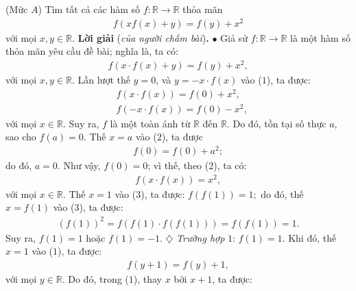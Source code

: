 \begin{multicols}{2}
	{}
	(Mức $A$) Tìm tất cả các hàm số \linebreak $f: \mathbb{R} \rightarrow \mathbb{R}$ thỏa mãn
	\begin{align*}
		f(x f(x)+y)=f(y)+x^{2}
	\end{align*}
	với mọi $x,y\in\mathbb R$.
	\vskip 0.05cm
	\textbf{\color{thachthuctoanhoc}Lời giải} (\textit{của người chấm bài})\textbf{\color{thachthuctoanhoc}.}
	\vskip 0.05cm
	$\bullet$ Giả sử $f: \mathbb{R} \to \mathbb{R}$ là một hàm số thỏa mãn yêu cầu đề bài; nghĩa là, ta có:
	\begin{align*}
		f\left( {x \cdot f\left( x \right) + y} \right) = f\left( y \right) + {x^2}, \tag{$1$}
	\end{align*}
	với mọi  $x,y \in \mathbb{R}$.
	\vskip 0.05cm
	Lần lượt thế $y = 0$, và $y = -x \cdot f(x)$  vào ($1$), ta được:
	\begin{align*}
		&f\left( {x \cdot f\left( x \right)} \right) = f\left( 0 \right) + {x^2}, \tag{$2$}\\
		&f\left( { - x \cdot f\left( x \right)} \right) = f\left( 0 \right) - {x^2},
	\end{align*}
	với mọi  $x \in \mathbb{R}$. Suy ra, $f$  là một toàn ánh từ $\mathbb{R}$  đến  $\mathbb{R}$. Do đó, tồn tại số thực $a$, sao cho $f(a )= 0$.
	\vskip 0.05cm 
	Thế $x = a$ vào ($2$), ta được
	\begin{align*}
		f\left( 0 \right) = f\left( 0 \right) + {a^2};
	\end{align*}
	do đó, $a = 0$. Như vậy,  $f(0) = 0$; vì thế, theo ($2$), ta có:
	\begin{align*}
		f\left( {x \cdot f\left( x \right)} \right) = {x^2}, \tag{$3$}
	\end{align*}
	với mọi  $x \in \mathbb{R}$.
	\vskip 0.05cm
	Thế $x = 1$ vào ($3$), ta được:  $f\left( {f\left( 1 \right)} \right) = 1;$ do đó, thế  $x = f(1)$ vào ($3$), ta được:
	\begin{align*}
		{\left( {f(1)} \right)^2} \!=\! f\left( {f(1) \cdot f\left( {f(1)} \right)} \right) \!=\! f\left( {f(1)} \right) \!=\! 1.
	\end{align*}
	Suy ra, $f(1) = 1$ hoặc $f(1) = -1$.
	\vskip 0.05cm  
	$\diamondsuit$ \textit{Trường hợp} $1$: $f(1) = 1$.
	\vskip 0.05cm  
	Khi đó, thế $x = 1$ vào ($1$), ta được:
	\begin{align*}
		f\left( {y + 1} \right) = f\left( y \right) + 1,
	\end{align*}
	với mọi  $y \in \mathbb{R}$.
	\vskip 0.05cm
	Do đó, trong ($1$), thay $x$ bởi $x + 1$, ta được:

\end{multicols}
